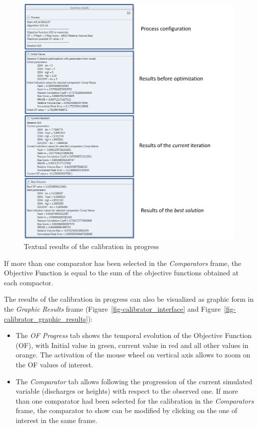 \documentclass[
  letterpaper,
  DIV=11,
  numbers=noendperiod]{scrreprt}
\begin{document}
\begin{figure}

{\centering \includegraphics{./figures/fig-calibrator_textual_results.png}

}

\caption{\label{fig-calibrator_textual_results}Textual results of the
calibration in progress}

\end{figure}

If more than one comparator has been selected in the \emph{Comparators}
frame, the Objective Function is equal to the sum of the objective
functions obtained at each compactor.

The results of the calibration in progress can also be visualized as
graphic form in the \emph{Graphic} \emph{Results} frame
(Figure~\ref{fig-calibrator_interface} and
Figure~\ref{fig-calibrator_graphic_results}):

\begin{itemize}
\item
  The \emph{OF Progress} tab shows the temporal evolution of the
  Objective Function (OF), with Initial value in green, current value in
  red and all other values in orange. The activation of the mouse wheel
  on vertical axis allows to zoom on the OF values of interest.
\item
  The \emph{Comparator} tab allows following the progression of the
  current simulated variable (discharges or heights) with respect to the
  observed one. If more than one comparator had been selected for the
  calibration in the \emph{Comparators} frame, the comparator to show
  can be modified by clicking on the one of interest in the same frame.
\end{itemize}
\end{document}

